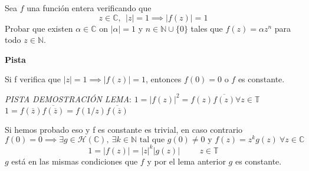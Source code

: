 \begin{ejer}
	Sea $f$ una función entera verificando que
	$$ z\in\mathbb{C}, \ \ |z|=1 \implies |f(z)|=1 $$
	Probar que existen $\alpha\in\mathbb{C}$ on $|\alpha|=1$ y $n\in\mathbb{N}\cup \{0\}$ tales que $f(z) = \alpha z^n$ para todo $z\in\mathbb{N}$.
\end{ejer}
\begin{sol}

\textbf{Pista}

\begin{lema}
	
Si f verifica que $|z|=1 \implies |f(z)|=1$, entonces $f(0)=0$ o $f$ es constante.

\textit{PISTA DEMOSTRACIÓN LEMA}:
$1=|f(z)|^2 = f(z)\overline{f(z)} \forall z\in\mathbb{T}$ 
$1= f(\overline{z})\overline{f(\overline{z})} = f(1/z)\overline{f(\overline{z})}$
\end{lema}


Si hemos probado eso y f es constante es trivial, en caso contrario
$$f(0)=0 \implies \exists g\in\mathcal{H}(\mathbb{C}), \ \exists k\in\mathbb{N} \text{ tal que }g(0) \not =0 \text{ y }f(z) = z^kg(z)\ \forall z\in\mathbb{C}$$
$$1=|f(z)| = |z|^k|g(z)| \hspace{1cm} z\in\mathbb{T}$$
$g$ está en las mismas condiciones que $f$ y por el lema anterior $g$ es constante.
\end{sol}